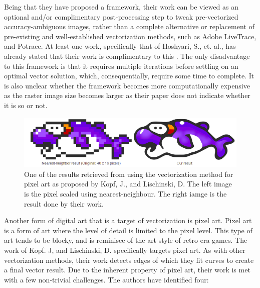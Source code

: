 Being that they have proposed a framework, their work can be viewed as an optional and/or complimentary post-processing step to tweak pre-vectorized accuracy-ambiguous images, rather than a complete alternative or replacement of pre-existing and well-established vectorization methods, such as Adobe LiveTrace, and Potrace. At least one work, specifically that of Hoshyari, S., et. al., has already stated that their work is complimentary to this \cite{hoshyari2018perceptiondriven}. The only disadvantage to this framework is that it requires multiple iterations before settling on an optimal vector solution, which, consequentially, require some time to complete. It is also unclear whether the framework becomes more computationally expensive as the raster image size becomes larger as their paper does not indicate whether it is so or not.

\begin{figure}[h]
	\centering
	\includegraphics[scale=0.5]{images/chap02-rrl/kopf.png}
	\caption{One of the results retrieved from using the vectorization method for pixel art as proposed by Kopf, J., and Lischinski, D. The left image is the pixel scaled using nearest-neighbour. The right iamge is the result done by their work.}
	\label{fig:kopf-result}
\end{figure}

Another form of digital art that is a target of vectorization is pixel art. Pixel art is a form of art where the level of detail is limited to the pixel level. This type of art tends to be blocky, and is reminisce of the art style of retro-era games. The work of Kopf. J, and Lischinski, D. specifically targets pixel art. As with other vectorization methods, their work detects edges of which they fit curves to create a final vector result. Due to the inherent property of pixel art, their work is met with a few non-trivial challenges. The authors have identified four:

